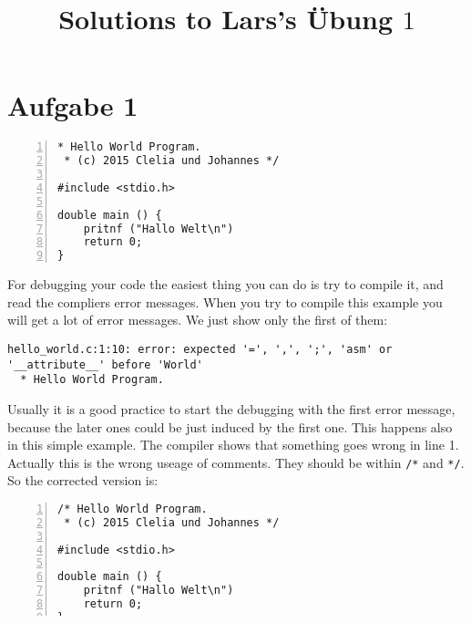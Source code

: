 \documentclass{article}[12pt]
\title{Solutions to Lars's Übung $1$}
\newenvironment{codelisting}{\fontfamily{pcr}\selectfont%
\lstset{commentstyle=\textit}\lstset{language=c}}{\fontfamily{ptm}\selectfont}
\begin{document}
\maketitle
\section{Aufgabe 1}
\begin{codelisting}
\begin{lstlisting}[numbers=left,numberstyle=\tiny,frame=tlrb,showstringspaces=false]
 * Hello World Program.
 * (c) 2015 Clelia und Johannes */

#include <stdio.h>

double main () {
    pritnf ("Hallo Welt\n")
    return 0;
}
\end{lstlisting}
\end{codelisting}
For debugging your code the easiest thing you can do is try to compile it, and read the compliers error messages.
When you try to compile this example you will get a lot of error messages. We just show only the first of them:
\begin{lstlisting}
hello_world.c:1:10: error: expected '=', ',', ';', 'asm' or '__attribute__' before 'World'
  * Hello World Program.
\end{lstlisting}
Usually it is a good practice to start the debugging with the first error message, because the later ones could be 
just induced by the first one. This happens also in this simple example. The compiler shows that something goes wrong 
in line 1. Actually this is the wrong useage of comments. They should be within \texttt{/*} and \texttt{*/}. So the corrected
version is:
\begin{codelisting}
\begin{lstlisting}[numbers=left,numberstyle=\tiny,frame=tlrb,showstringspaces=false]
/* Hello World Program.
 * (c) 2015 Clelia und Johannes */

#include <stdio.h>

double main () {
    pritnf ("Hallo Welt\n")
    return 0;
}
\end{lstlisting}
\end{codelisting}
When you try to compile this one, this would not work as well. But fortunately we have much less error messeages:
\begin{lstlisting}
hello_world.c: In function 'main':
hello_world.c:7:5: warning: implicit declaration of function 'pritnf' [-Wimplicit-function-declaration]
     pritnf ("Hallo Welt\n")
     ^
hello_world.c:8:5: error: expected ';' before 'return'
     return 0;
\end{lstlisting}
\end{document}
